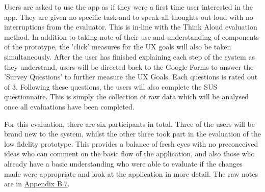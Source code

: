 \documentclass[a4 paper, 12pt]{article}
\begin{document}
    Users are asked to use the app as if they were a first time user interested in the app. They are given no specific task and to speak all thoughts out loud with no interruptions from the evaluator. This is in-line with the Think Aloud evaluation method. In addition to taking note of their use and understanding of components of the prototype, the 'click' measures for the UX goals will also be taken simultaneously. After the user has finished explaining each step of the system as they understand, users will be directed back to the Google Forms to answer the 'Survey Questions' to further measure the UX Goals. Each questions is rated out of 3. Following these questions, the users will also complete the SUS questionnaire. This is simply the collection of raw data which will be analysed once all evaluations have been completed.
  
    For this evaluation, there are six participants in total. Three of the users will be brand new to the system, whilst the other three took part in the evaluation of the low fidelity prototype. This provides a balance of fresh eyes with no preconceived ideas who can comment on the basic flow of the application, and also those who already have a basic understanding who were able to evaluate if the changes made were appropriate and look at the application in more detail. The raw notes are in \hyperref[sec:B.7]{Appendix B.7}. 
\end{document}
